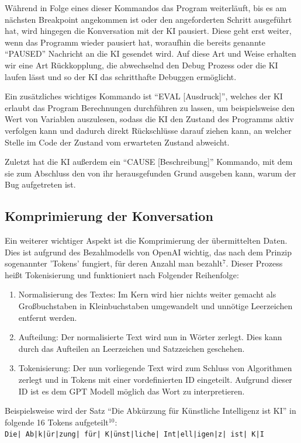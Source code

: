 \documentclass[a4paper,12pt,ngerman]{scrartcl}
\begin{document}
Während in Folge eines dieser Kommandos das Program weiterläuft, bis es am nächsten Breakpoint angekommen ist oder den angeforderten Schritt ausgeführt hat, wird hingegen die Konversation mit der KI pausiert. Diese geht erst weiter, wenn das Programm wieder pausiert hat, woraufhin die bereits genannte ``PAUSED'' Nachricht an die KI gesendet wird. Auf diese Art und Weise erhalten wir eine Art Rückkopplung, die abwechselnd den Debug Prozess oder die KI laufen lässt und so der KI das schritthafte Debuggen ermöglicht.

Ein zusätzliches wichtiges Kommando ist ``EVAL [Ausdruck]'', welches der KI erlaubt das Program Berechnungen durchführen zu lassen, um beispielsweise den Wert von Variablen auszulesen, sodass die KI den Zustand des Programms aktiv verfolgen kann und dadurch direkt Rückschlüsse darauf ziehen kann, an welcher Stelle im Code der Zustand vom erwarteten Zustand abweicht.

Zuletzt hat die KI außerdem ein ``CAUSE [Beschreibung]'' Kommando, mit dem sie zum Abschluss den von ihr herausgefunden Grund ausgeben kann, warum der Bug aufgetreten ist.

\subsection{Komprimierung der Konversation}
\label{sec:compression}

Ein weiterer wichtiger Aspekt ist die Komprimierung der übermittelten Daten. Dies ist aufgrund des Bezahlmodells von OpenAI wichtig, das nach dem Prinzip sogenannter 'Tokens' fungiert, für deren Anzahl man bezahlt$^7$. Dieser Prozess heißt Tokenisierung und funktioniert nach Folgender Reihenfolge:
\begin{enumerate}
	\item Normalisierung des Textes: Im Kern wird hier nichts weiter gemacht als Großbuchstaben in Kleinbuchstaben umgewandelt und unnötige Leerzeichen entfernt werden.
	\item Aufteilung: Der normalisierte Text wird nun in Wörter zerlegt. Dies kann durch das Aufteilen an Leerzeichen und Satzzeichen geschehen.
	\item Tokenisierung: Der nun vorliegende Text wird zum Schluss von Algorithmen zerlegt und in Tokens mit einer vordefinierten ID eingeteilt. Aufgrund dieser ID ist es dem GPT Modell möglich das Wort zu interpretieren.
\end{enumerate}

Beispielsweise wird der Satz ``Die Abkürzung für Künstliche Intelligenz ist KI'' in folgende 16 Tokens aufgeteilt$^{10}$:\\
\texttt{Die| Ab|k|ür|zung| für| K|ünst|liche| Int|ell|igen|z| ist| K|I}
\end{document}
